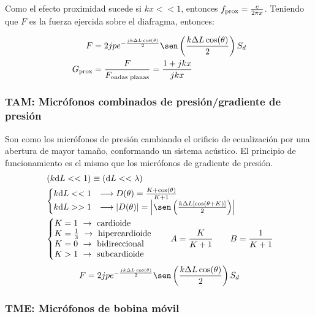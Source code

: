 \documentclass[a4paper, 8pt]{extarticle}
\renewcommand{\sin}{\sen}
\begin{document}
\begin{multicols}{3}
  Como el efecto proximidad sucede si $kx << 1$, entonces $f _{\textnormal{prox}} = \frac{c}{2 \pi x}$. Teniendo que $F$ es la fuerza ejercida sobre el diafragma, entonces:

  \begin{align*}
    F                      & = 2jp e^{- \frac{jk \Delta L \cos (\theta)}{2}} \sin \left( \frac{k \Delta L \cos (\theta)}{2} \right) S_d \\
    G _{\textnormal{prox}} & = \frac{F}{F _{\textnormal{ondas planas}}} = \frac{1 + jkx}{jkx}
  \end{align*}

  \subsubsection{TAM: Micrófonos combinados de presión/gradiente de presión}
  Son como los micrófonos de presión cambiando el orificio de ecualización por una abertura de mayor tamaño, conformando un sistema acústico. El principio de funcionamiento es el mismo que los micrófonos de gradiente de presión.
  \begin{align*}
     & \left( k \dd L << 1 \right) \equiv \left( \dd L << \lambda \right)                                                             \\
     & \left\lbrace
    \begin{matrix*}[l]
      k \dd L << 1 & \longrightarrow D (\theta ) = \frac{K + \cos (\theta)}{K + 1}                                                      \\
      k \dd L >> 1 & \longrightarrow \abs{D (\theta )} = \abs{\sin \left( \frac{k\Delta L \left[ \cos (\theta + K) \right]}{2} \right)}
    \end{matrix*} \right. \\
     & \left\lbrace
    \begin{matrix*}[l]
      K = 1 \ \rightarrow \text{ cardioide} \\
      K = \frac{1}{3} \ \rightarrow \text{ hipercardioide} \\
      K = 0 \ \rightarrow \text{ bidireccional} \\
      K > 1 \ \rightarrow \text{ subcardioide}
    \end{matrix*}
    \right.  \qquad  A = \frac{K}{K + 1} \qquad B = \frac{1}{K + 1}
  \end{align*}
  \[ F = 2jp e^{- \frac{jk \Delta L \cos (\theta)}{2}} \sin \left( \frac{k \Delta L \cos (\theta)}{2} \right) S_d \]

  \subsubsection{TME: Micrófonos de bobina móvil}

\end{multicols}
\end{document}
